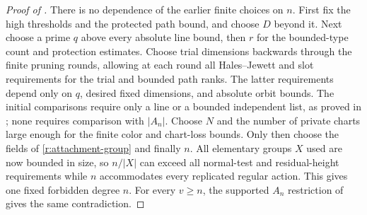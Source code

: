 \begin{proof}[Proof of ]
There is no dependence of the earlier finite choices on $n$.
First fix the high thresholds and the protected path bound, and
choose $D$ beyond it.  Next choose a prime $q$ above every absolute
line bound, then $r$ for the bounded-type count and protection
estimates.  Choose trial dimensions backwards through the finite
pruning rounds, allowing at each round all Hales--Jewett and
 slot requirements for the trial and bounded
path ranks.  The latter requirements depend only on $q$, desired
fixed dimensions, and absolute orbit bounds.  The initial
comparisons require only a line or a bounded independent list, as
proved in ; none requires comparison with
$|A_n|$.  Choose $N$ and the number of private charts large enough
for the finite color and chart-loss bounds.  Only then choose the
fields of \eqref{r:attachment-group} and finally $n$.
All elementary groups $X$ used are now bounded in size, so $n/|X|$
can exceed all normal-test and residual-height requirements while
$n$ accommodates every replicated regular action.  This gives one
fixed forbidden degree $n$.  For every $v\ge n$, the supported
$A_n$ restriction of  gives the same contradiction.
\end{proof}
